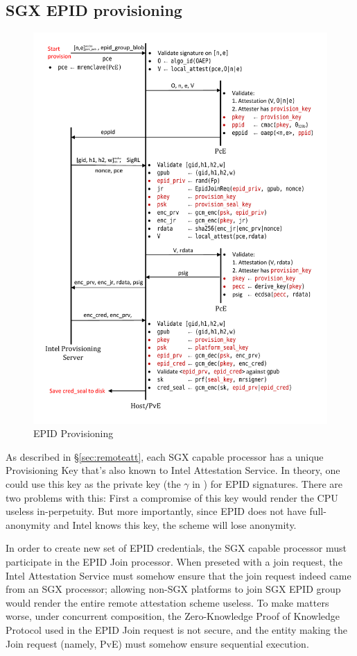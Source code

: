 \documentclass[10pt, letterpaper]{article}
\newcommand{\secref}[1]{\S\ref{#1}}
\newcommand{\pve}{\textsf{PvE}}
\begin{document}
  \subsection{SGX EPID provisioning}
  \label{ssec:epidprov}
  \begin{figure}
  \centering
  \includegraphics[width=0.8\linewidth]{Diagrams/EpidProvisioning}
  \caption{EPID Provisioning}
  \label{fig:epidprov}
  \end{figure}

  As described in \secref{sec:remoteatt}, each SGX capable processor
  has a unique Provisioning Key that's also known to Intel Attestation
  Service. In theory, one could use this key as the private key (the
  $\gamma$ in \cite{epid}) for EPID signatures. There are two problems
  with this: First a compromise of this key would render the CPU
  useless in-perpetuity. But more importantly, since EPID does not
  have full-anonymity and Intel knows this key, the scheme will lose
  anonymity.

  In order to create new set of EPID credentials, the SGX capable
  processor must participate in the EPID Join processor. When preseted
  with a join request, the Intel Attestation Service must somehow
  ensure that the join request indeed came from an SGX processor;
  allowing non-SGX platforms to join SGX EPID group would render the
  entire remote attestation scheme useless. To make matters worse,
  under concurrent composition, the Zero-Knowledge Proof of Knowledge
  Protocol used in the EPID Join request is not secure, and the entity
  making the Join request (namely, \pve) must somehow ensure
  sequential execution.
\end{document}
